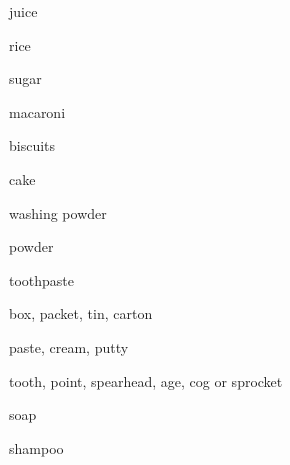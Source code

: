 \begin{flashcard}{\LARGE juice}
\LARGE {}
\end{flashcard}
\begin{flashcard}{\LARGE rice}
\LARGE {}
\end{flashcard}
\begin{flashcard}{\LARGE sugar}
\LARGE {}
\end{flashcard}
\begin{flashcard}{\LARGE macaroni}
\LARGE {}
\end{flashcard}
\begin{flashcard}{\LARGE biscuits}
\LARGE {}
\end{flashcard}
\begin{flashcard}{\LARGE cake}
\LARGE {}
\end{flashcard}
\begin{flashcard}{\LARGE washing powder}
\LARGE {}
\end{flashcard}
\begin{flashcard}{\LARGE powder}
\LARGE {}
\end{flashcard}
\begin{flashcard}{\LARGE toothpaste}
\LARGE {}
\end{flashcard}
\begin{flashcard}{\LARGE box, packet, tin, carton}
\LARGE {}
\end{flashcard}
\begin{flashcard}{\LARGE paste, cream, putty}
\LARGE {}
\end{flashcard}
\begin{flashcard}{\LARGE tooth, point, spearhead, age, cog or sprocket}
\LARGE {}
\end{flashcard}
\begin{flashcard}{\LARGE soap}
\LARGE {}
\end{flashcard}
\begin{flashcard}{\LARGE shampoo}
\LARGE {}
\end{flashcard}

